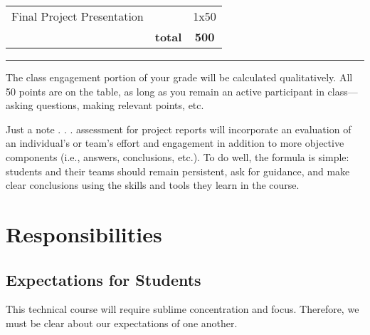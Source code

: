 \documentclass[
]{article}
\begin{document}
\begin{longtable}[]{@{}llc@{}}
\begin{minipage}[t]{0.46\columnwidth}
Final Project Presentation\strut
\end{minipage} & \begin{minipage}[t]{0.15\columnwidth}\raggedright
\strut
\end{minipage} & \begin{minipage}[t]{0.31\columnwidth}\centering
1x50\strut
\end{minipage}\tabularnewline
\begin{minipage}[t]{0.46\columnwidth}\raggedright
\strut
\end{minipage} & \begin{minipage}[t]{0.15\columnwidth}\raggedright
\textbf{total}\strut
\end{minipage} & \begin{minipage}[t]{0.31\columnwidth}\centering
\textbf{500}\strut
\end{minipage}\tabularnewline
\bottomrule
\end{longtable}

\begin{center}\rule{0.5\linewidth}{0.5pt}\end{center}

The class engagement portion of your grade will be calculated
qualitatively. All 50 points are on the table, as long as you remain an
active participant in class---asking questions, making relevant points,
etc.

Just a note . . . assessment for project reports will incorporate an
evaluation of an individual's or team's effort and engagement in
addition to more objective components (i.e., answers, conclusions,
etc.). To do well, the formula is simple: students and their teams
should remain persistent, ask for guidance, and make clear conclusions
using the skills and tools they learn in the course.

\hypertarget{responsibilities}{%
\section{Responsibilities}\label{responsibilities}}

\hypertarget{expectations-for-students}{%
\subsection{Expectations for Students}\label{expectations-for-students}}

This technical course will require sublime concentration and focus.
Therefore, we must be clear about our expectations of one another.
\end{document}

